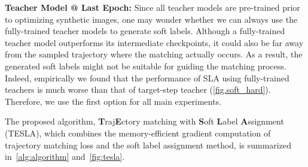 \documentclass[10pt,twocolumn,letterpaper]{article}
\begin{document}
\textbf{Teacher Model @ Last Epoch:} Since all teacher models are pre-trained prior to optimizing synthetic images, one may wonder whether we can always use the fully-trained teacher models to generate soft labels.
Although a fully-trained teacher model outperforms its intermediate checkpoints, it could also be far away from the sampled trajectory where the matching actually occurs.
As a result, the generated soft labels might not be suitable for guiding the matching process.
Indeed, empirically we found that the performance of SLA using fully-trained teachers is much worse than that of target-step teacher (\cref{fig.soft_hard}).
Therefore, we use the first option for all main experiments. 

The proposed algorithm, {\bf T}raj{\bf E}ctory matching with {\bf S}oft {\bf L}abel {\bf A}ssignment (TESLA), which combines the memory-efficient gradient computation of trajectory matching loss and the soft label assignment method, is summarized in~\cref{alg:algorithm} and~\cref{fig:tesla}.
\end{document}
